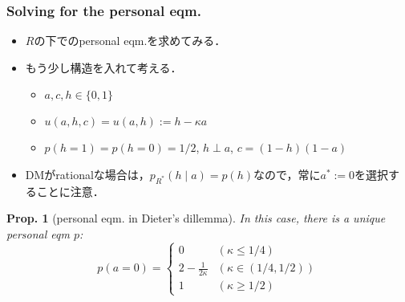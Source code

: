 \documentclass[11pt,a4paper,dvipdfmx]{article}
\theoremstyle{plain}
\newtheorem{prop}{Prop.}[section]
\begin{document}
\subsubsection{Solving for the personal eqm.}
\begin{itemize}
	\item $R$の下でのpersonal eqm.を求めてみる．
	\item もう少し構造を入れて考える．
	\begin{itemize}
		\item $a, c, h \in \{0,1\}$
		\item $u(a,h,c) = u(a,h) := h - \kappa a$
		\item $p(h=1) = p(h=0) = 1/2$, $h \perp a$, $c = (1-h)(1-a)$
	\end{itemize}
	\item DMがrationalな場合は，$p_{R^*}(h \mid a) = p(h)$なので，常に$a^* := 0$を選択することに注意．
\end{itemize}



\begin{screen}
\begin{prop}[personal eqm. in Dieter's dillemma]
	In this case, there is a unique personal eqm $p$:
	\[
	p(a = 0) = 
	\begin{cases}
		0 & (\kappa \leq 1/4) \\
		2 - \frac{1}{2 \kappa} & (\kappa \in (1/4, 1/2)) \\
		1 & (\kappa \geq 1/2)
	\end{cases}
	\]
\end{prop}
\end{screen}
\end{document}
